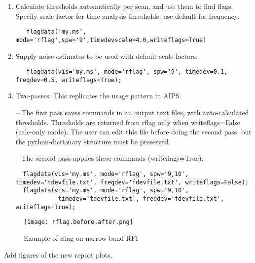 \begin{enumerate}

\item Calculate thresholds automatically per scan, and use them to find flags.
                             Specify scale-factor for time-analysis thresholds, use default for frequency.

\begin{verbatim}
   flagdata('my.ms', mode='rflag',spw='9',timedevscale=4.0,writeflags=True)
\end{verbatim}
 
\item  Supply noise-estimates to be used with default scale-factors. 
  
\begin{verbatim}
   flagdata(vis='my.ms', mode='rflag', spw='9', timedev=0.1, freqdev=0.5, writeflags=True);
\end{verbatim}

\item Two-passes. This replicates the usage pattern in AIPS.

                             -- The first pass saves commands in an output text files, with auto-calculated thresholds.
                                Thresholds are returned from rflag only when writeflags=False (calc-only mode). 
                                The user can edit this file before doing the second pass, but the python-dictionary 
                                 structure must be preserved.

                             -- The second pass applies these commands (writeflags=True).

\begin{verbatim}
  flagdata(vis='my.ms', mode='rflag', spw='9,10',                                               timedev='tdevfile.txt', freqdev='fdevfile.txt', writeflags=False);
  flagdata(vis='my.ms', mode='rflag', spw='9,10', 
            timedev='tdevfile.txt', freqdev='fdevfile.txt', writeflags=True);
\end{verbatim}
            
\end{enumerate} 


\begin{figure}
\texttt{[image: rflag.before.after.png]}
\caption{Example of rflag on narrow-band RFI}
\end{figure}

{\red Add figures of the new report plots.}

